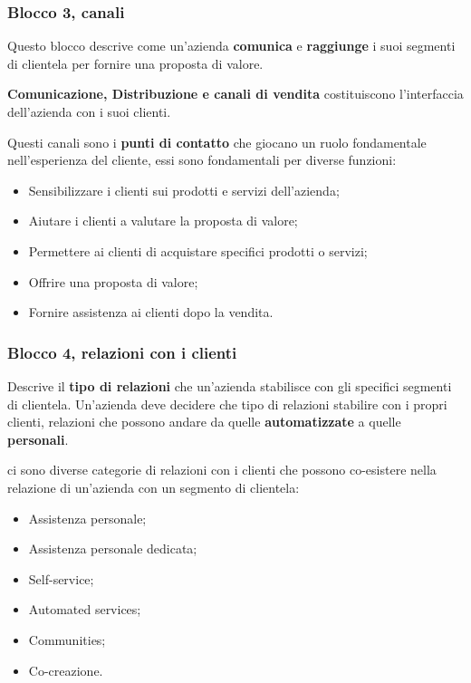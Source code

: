 \documentclass[14pt]{extarticle}
\begin{document}
\subsubsection{Blocco 3, canali}

Questo blocco descrive come un'azienda \textbf{comunica} e \textbf{raggiunge} i
suoi segmenti di clientela per fornire una proposta di valore.

\textbf{Comunicazione, Distribuzione e canali di vendita} costituiscono
l'interfaccia dell'azienda con i suoi clienti.

Questi canali sono i \textbf{punti di contatto} che giocano un ruolo
fondamentale nell'esperienza del cliente, essi sono fondamentali per diverse
funzioni:

\begin{itemize}
    \item Sensibilizzare i clienti sui prodotti e servizi dell'azienda;
    \item Aiutare i clienti a valutare la proposta di valore;
    \item Permettere ai clienti di acquistare specifici prodotti o servizi;
    \item Offrire una proposta di valore;
    \item Fornire assistenza ai clienti dopo la vendita.   
\end{itemize}

\subsubsection{Blocco 4, relazioni con i clienti}

Descrive il \textbf{tipo di relazioni} che un'azienda stabilisce con gli
specifici segmenti di clientela. Un'azienda deve decidere che tipo di relazioni
stabilire con i propri clienti, relazioni che possono andare da quelle
\textbf{automatizzate} a quelle \textbf{personali}.

ci sono diverse categorie di relazioni con i clienti che possono co-esistere
nella relazione di un'azienda con un segmento di clientela:

\begin{itemize}
    \item Assistenza personale;
    \item Assistenza personale dedicata;
    \item Self-service;
    \item Automated services;
    \item Communities;
    \item Co-creazione.
\end{itemize}
\end{document}
